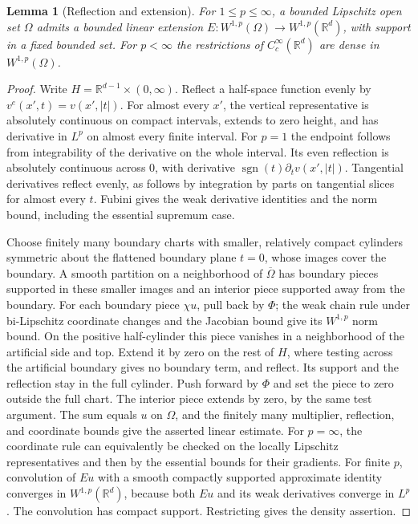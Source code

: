 \documentclass[11pt,oneside,openany]{book}
\newtheorem{lemma}[theorem]{Lemma}
\theoremstyle{definition}
\theoremstyle{remark}
\begin{document}
\begin{lemma}[Reflection and extension]\label{p102:u5-integer-extension}
For \(1\le p\le\infty\), a bounded Lipschitz open set \(\Omega\)
admits a bounded linear extension \(E:W^{1,p}(\Omega)\to
W^{1,p}(\mathbb R^d)\), with support in a fixed bounded set.
For \(p<\infty\) the restrictions of \(C_c^\infty(\mathbb R^d)\)
are dense in \(W^{1,p}(\Omega)\).
\end{lemma}
\begin{proof}
Write \(H=\mathbb R^{d-1}\times(0,\infty)\). Reflect a half-space
function evenly by \(v^e(x',t)=v(x',|t|)\).
For almost every \(x'\), the vertical representative is absolutely
continuous on compact intervals, extends to zero height, and has
derivative in \(L^p\) on almost every finite interval. For \(p=1\)
the endpoint follows from integrability of the derivative on the whole
interval. Its even reflection is absolutely continuous across \(0\),
with derivative \(\operatorname{sgn}(t)\partial_t v(x',|t|)\).
Tangential derivatives reflect evenly, as follows by integration by
parts on tangential slices for almost every \(t\). Fubini gives the weak
derivative identities and the norm bound, including the essential
supremum case.

Choose finitely many boundary charts with smaller, relatively compact
cylinders symmetric about the flattened boundary plane \(t=0\), whose
images cover the boundary. A smooth partition on a
neighborhood of \(\overline\Omega\) has boundary pieces supported in
these smaller images and an interior piece supported away from the
boundary. For each boundary piece \(\chi u\), pull back by \(\Phi\);
the weak chain rule under bi-Lipschitz coordinate changes and the
Jacobian bound give its \(W^{1,p}\) norm bound. On the positive
half-cylinder this piece vanishes in a neighborhood of the artificial
side and top. Extend it by zero on the rest of \(H\), where testing
across the artificial boundary gives no boundary term, and reflect.
Its support and the reflection stay in the full cylinder. Push forward
by \(\Phi\) and set the piece to zero outside the full chart. The
interior piece extends by zero, by the same test argument. The sum
equals \(u\) on \(\Omega\), and the finitely many multiplier, reflection,
and coordinate bounds give the asserted linear estimate. For
\(p=\infty\), the coordinate rule can equivalently be checked on the
locally Lipschitz representatives and then by the essential bounds for
their gradients. For finite \(p\), convolution of \(Eu\) with a
smooth compactly supported approximate identity converges in
\(W^{1,p}(\mathbb R^d)\), because both \(Eu\) and its weak derivatives
converge in \(L^p\). The convolution has compact support. Restricting
gives the density assertion.
\end{proof}
\end{document}
